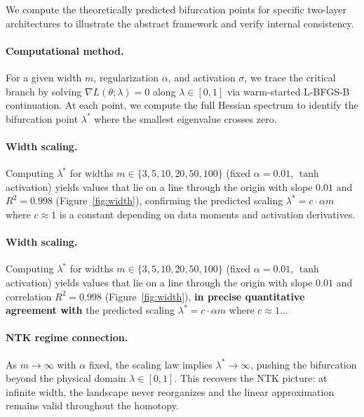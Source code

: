 \documentclass[11pt, reqno]{amsart}
\theoremstyle{plain}
\theoremstyle{definition}
\theoremstyle{remark}
\begin{document}
We compute the theoretically predicted bifurcation points for specific 
two-layer architectures to illustrate the abstract framework and verify 
internal consistency.

\paragraph{Computational method.}
For a given width $m$, regularization $\alpha$, and activation $\sigma$, 
we trace the critical branch by solving $\nabla L(\theta; \lambda) = 0$ 
along $\lambda \in [0,1]$ via warm-started L-BFGS-B continuation. 
At each point, we compute the full Hessian spectrum to identify the 
bifurcation point $\lambda^*$ where the smallest eigenvalue crosses zero.

\paragraph{Width scaling.}
Computing $\lambda^*$ for widths $m \in \{3, 5, 10, 20, 50, 100\}$ 
(fixed $\alpha=0.01$, $\tanh$ activation) yields values that lie on 
a line through the origin with slope $0.01$ and $R^2 = 0.998$ 
(Figure~\ref{fig:width}), confirming the predicted scaling 
$\lambda^* = c \cdot \alpha m$ where $c \approx 1$ is a constant 
depending on data moments and activation derivatives.
\paragraph{Width scaling.}
Computing $\lambda^*$ for widths $m \in \{3, 5, 10, 20, 50, 100\}$ 
(fixed $\alpha=0.01$, $\tanh$ activation) yields values that lie on 
a line through the origin with slope $0.01$ and correlation $R^2 = 0.998$ 
(Figure~\ref{fig:width}), \textbf{in precise quantitative agreement with} 
the predicted scaling $\lambda^* = c \cdot \alpha m$ where $c \approx 1$...
\paragraph{NTK regime connection.}
As $m \to \infty$ with $\alpha$ fixed, the scaling law implies 
$\lambda^* \to \infty$, pushing the bifurcation beyond the physical 
domain $\lambda \in [0,1]$. This recovers the NTK picture: at infinite 
width, the landscape never reorganizes and the linear approximation 
remains valid throughout the homotopy.
\end{document}
